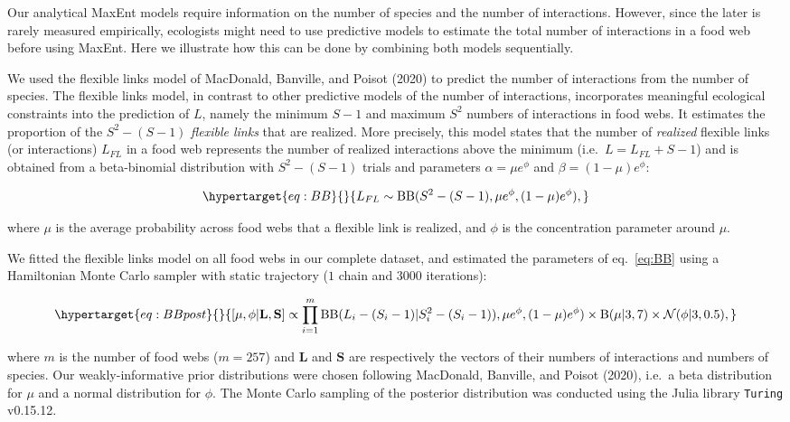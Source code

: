 \documentclass[11pt]{article}
\begin{document}
Our analytical MaxEnt models require information on the number of
species and the number of interactions. However, since the later is
rarely measured empirically, ecologists might need to use predictive
models to estimate the total number of interactions in a food web before
using MaxEnt. Here we illustrate how this can be done by combining both
models sequentially.

We used the flexible links model of MacDonald, Banville, and Poisot
(2020) to predict the number of interactions from the number of species.
The flexible links model, in contrast to other predictive models of the
number of interactions, incorporates meaningful ecological constraints
into the prediction of \(L\), namely the minimum \(S-1\) and maximum
\(S^2\) numbers of interactions in food webs. It estimates the
proportion of the \(S^2 - (S - 1)\) \emph{flexible links} that are
realized. More precisely, this model states that the number of
\emph{realized} flexible links (or interactions) \(L_{FL}\) in a food
web represents the number of realized interactions above the minimum
(i.e.~\(L = L_{FL} + S - 1\)) and is obtained from a beta-binomial
distribution with \(S^2 - (S - 1)\) trials and parameters
\(\alpha = \mu e^\phi\) and \(\beta = (1 - \mu) e^\phi\):

\begin{equation}\protect\hypertarget{eq:BB}{}{L_{FL} \sim \mathrm{BB}(S^2 - (S - 1), \mu e^\phi, (1 - \mu) e^\phi),}\label{eq:BB}\end{equation}

where \(\mu\) is the average probability across food webs that a
flexible link is realized, and \(\phi\) is the concentration parameter
around \(\mu\).

We fitted the flexible links model on all food webs in our complete
dataset, and estimated the parameters of eq.~\ref{eq:BB} using a
Hamiltonian Monte Carlo sampler with static trajectory (\(1\) chain and
\(3000\) iterations):

\begin{equation}\protect\hypertarget{eq:BBpost}{}{ [\mu, \phi| \textbf{L}, \textbf{S}] \propto \prod_{i = 1}^{m} \mathrm{BB}(L_i - (S_i - 1) | S_i^2 - (S_i - 1)), \mu e^{\phi}, (1 - \mu) e^\phi) \times \mathrm{B}(\mu| 3 , 7 ) \times \mathcal{N}(\phi | 3, 0.5), }\label{eq:BBpost}\end{equation}

where \(m\) is the number of food webs (\(m = 257\)) and \(\textbf{L}\)
and \(\textbf{S}\) are respectively the vectors of their numbers of
interactions and numbers of species. Our weakly-informative prior
distributions were chosen following MacDonald, Banville, and Poisot
(2020), i.e.~a beta distribution for \(\mu\) and a normal distribution
for \(\phi\). The Monte Carlo sampling of the posterior distribution was
conducted using the Julia library \texttt{Turing} v0.15.12.
\end{document}
